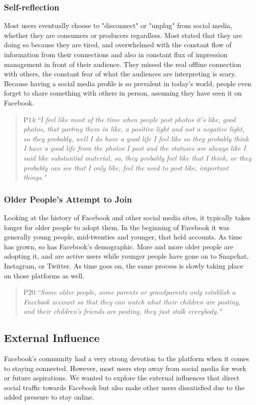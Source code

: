 \subsubsection{Self-reflection}
Most users eventually choose to "disconnect" or "unplug" from social media, whether they are consumers or producers regardless. Most stated that they are doing so because they are tired, and overwhelmed with the constant flow of information from their connections and also in constant flux of impression management in front of their audience. They missed the real offline connection with others, the constant fear of what the audiences are interpreting is scary. Because having a social media profile is so prevalent in today's world, people even forget to share something with others in person, assuming they have seen it on Facebook. 
\begin{quote}
P14:\textit{``I feel like most of the time when people post photos it's like, good photos, that portray them in like, a positive light and not a negative light, so they probably, well I do have a good life I feel like so they probably think I have a good life from the photos I post and the statuses are always like I said like substantial material, so, they probably feel like that I think, or they probably can see that I only like, feel the need to post like, important things."}
\end{quote} 

\subsubsection{Older People's Attempt to Join}
Looking at the history of Facebook and other social media sites, it typically takes longer for older people to adopt them. In the beginning of Facebook it was generally young people, mid-twenties and younger, that held accounts. As time has grown, so has Facebook's demographic. More and more older people are adopting it, and are active users while younger people have gone on to Snapchat, Instagram, or Twitter. As time goes on, the same process is slowly taking place on those platforms as well. 
\begin{quote}
P20:\textit{``Some older people, some parents or grandparents only establish a Facebook account so that they can watch what their children are posting, and their children's friends are posting, they just stalk everybody."}
\end{quote}


\subsection{External Influence}
Facebook's community had a very strong devotion to the platform when it comes to staying connected. However, most users step away from social media for work or future aspirations. We wanted to explore the external influences that direct social traffic towards Facebook but also make other users dissatisfied due to the added pressure to stay online.

